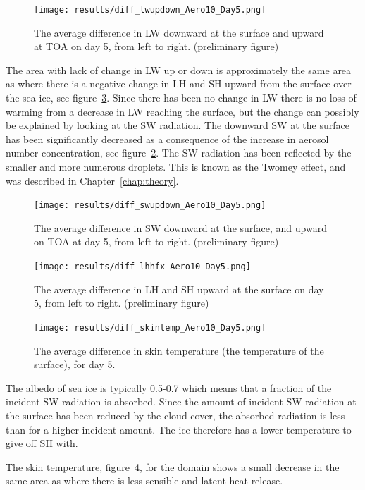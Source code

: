 \begin{figure}[h!]
\centering
\texttt{[image: results/diff\_lwupdown\_Aero10\_Day5.png]}
\caption{The average difference in LW downward at the surface and upward at TOA on day 5, from left to right. (preliminary figure)}
\label{fig:lwup_down_r3Day5}
\end{figure}

The area with lack of change in LW up or down is approximately the same area as where there is a negative change in LH and SH upward from the surface over the sea ice, see figure~\ref{fig:lhhfx_r3Day5}. Since there has been no change in LW there is no loss of warming from a decrease in LW reaching the surface, but the change can possibly be explained by looking at the SW radiation. The downward SW at the surface has been significantly decreased as a consequence of the increase in aerosol number concentration, see figure~\ref{fig:swup_down_r3Day5}. The SW radiation has been reflected by the smaller and more numerous droplets. This is known as the Twomey effect, and was described in Chapter~\ref{chap:theory}. 

\begin{figure}[h!]
\centering
\texttt{[image: results/diff\_swupdown\_Aero10\_Day5.png]}
\caption{The average difference in SW downward at the surface, and upward on TOA at day 5, from left to right. (preliminary figure)}
\label{fig:swup_down_r3Day5}
\end{figure}

\begin{figure}[h!]
\centering
\texttt{[image: results/diff\_lhhfx\_Aero10\_Day5.png]}
\caption{The average difference in LH and SH upward at the surface on day 5, from left to right. (preliminary figure)}
\label{fig:lhhfx_r3Day5}
\end{figure}

\begin{figure}[h!]
\centering
\texttt{[image: results/diff\_skintemp\_Aero10\_Day5.png]}
\caption{The average difference in skin temperature (the temperature of the surface), for day 5.}
\label{fig:skintemp_r3Day5}
\end{figure}
The albedo of sea ice is typically 0.5-0.7 which means that a fraction of the incident SW radiation is absorbed. Since the amount of incident SW radiation at the surface has been reduced by the cloud cover, the absorbed radiation is less than for a higher incident amount. The ice therefore has a lower temperature to give off SH with. 

The skin temperature, figure~\ref{fig:skintemp_r3Day5}, for the domain shows a small decrease in the same area as where there is less sensible and latent heat release.

